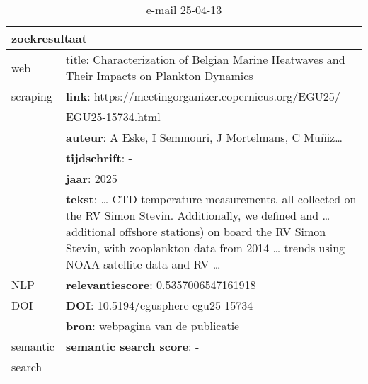 \begin{table}[h!]
    \caption{e-mail 25-04-13}
    \centering
    \begin{tabularx}{\textwidth}{|p{4cm}|X|} 
        \hline
        \multicolumn{2}{|X|}{\textbf{zoekresultaat}} \\
        \hline
        web &title: Characterization of Belgian Marine Heatwaves and Their Impacts on Plankton Dynamics\\
        scraping&\textbf{link}: https://meetingorganizer.copernicus.org/EGU25/\\&EGU25-15734.html\\
        &\textbf{auteur}: A Eske, I Semmouri, J Mortelmans, C Muñiz…\\
        &\textbf{tijdschrift}: -\\
        &\textbf{jaar}: 2025\\
        &\textbf{tekst}: … CTD temperature measurements, all collected on the RV Simon Stevin. Additionally, we defined and … additional offshore stations) on board the RV Simon Stevin, with zooplankton data from 2014 … trends using NOAA satellite data and RV …\\
        \hline
        NLP&\textbf{relevantiescore}: 0.5357006547161918\\
        \hline
        DOI&\textbf{DOI}: 10.5194/egusphere-egu25-15734\\
        &\textbf{bron}: webpagina van de publicatie\\
        \hline
        semantic&\textbf{semantic search score}: -\\
        search&\\
        \hline
    \end{tabularx}
    \label{table:email20250413}
\end{table}
